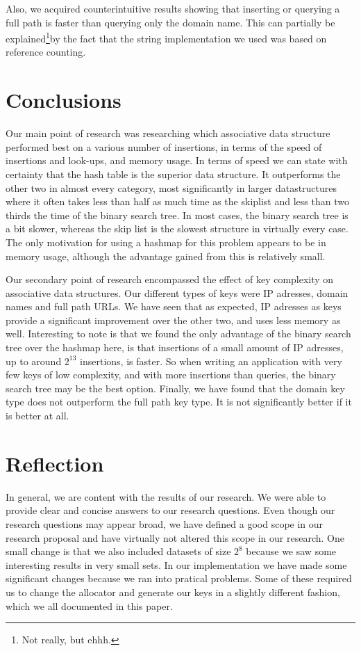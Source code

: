 \documentclass[12pt,a4paper]{article}
\begin{document}
    Also, we acquired counterintuitive results showing that inserting or querying a full path is
    faster than querying only the domain name.  This can partially be explained\footnote{Not really,
    but ehhh.}by the fact that the string implementation we used was based on reference counting.

    \section{Conclusions}
    Our main point of research was researching which associative data structure performed best on a
    various number of insertions, in terms of the speed of insertions and look-ups, and memory
    usage.  In terms of speed we can state with certainty that the hash table is the superior data
    structure.  It outperforms the other two in almost every category, most significantly in larger
    datastructures where it often takes less than half as much time as the skiplist and less than
    two thirds the time of the binary search tree.  In most cases, the binary search tree is a bit
    slower, whereas the skip list is the slowest structure in virtually every case. The only
    motivation for using a hashmap for this problem appears to be in memory usage, although the
    advantage gained from this is relatively small.

    Our secondary point of research encompassed the effect of key complexity on associative data
    structures.  Our different types of keys were IP adresses, domain names and full path URLs. We
    have seen that as expected, IP adresses as keys provide a significant improvement over the other
    two, and uses less memory as well. Interesting to note is that we found the only advantage of
    the binary search tree over the hashmap here, is that insertions of a small amount of IP
    adresses, up to around $2^13$ insertions, is faster. So when writing an application with very
    few keys of low complexity, and with more insertions than queries, the binary search tree may be
    the best option. Finally, we have found that the domain key type does not outperform the full
    path key type. It is not significantly better if it is better at all.

    \section{Reflection}
    In general, we are content with the results of our research. We were able to provide clear and
    concise answers to our research questions. Even though our research questions may appear broad,
    we have defined a good scope in our research proposal and have virtually not altered this scope
    in our research. One small change is that we also included datasets of size $2^8$ because we saw
    some interesting results in very small sets. In our implementation we have made some significant
    changes because we ran into pratical problems. Some of these required us to change the allocator
    and generate our keys in a slightly different fashion, which we all documented in this paper.
\end{document}

